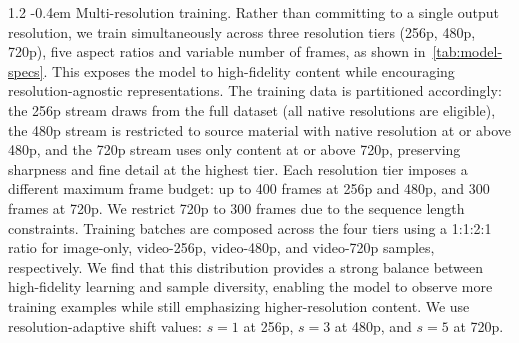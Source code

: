 \documentclass{llmxive}
\makeatletter
\providecommand{\paragraph}{  \@startsection{paragraph}{4}{\z@}    {1\baselineskip \@plus .2\baselineskip}    {-0.4em}    {\normalfont\normalsize\bfseries}}
\makeatother
\begin{document}
\paragraph{Multi-resolution training.}
Rather than committing to a single output resolution, we train simultaneously across three resolution tiers (256p, 480p, 720p), five aspect ratios and variable number of frames, as shown in~\cref{tab:model-specs}. This exposes the model to high-fidelity content while encouraging resolution-agnostic representations. The training data is partitioned accordingly: the 256p stream draws from the full dataset (all native resolutions are eligible), the 480p stream is restricted to source material with native resolution at or above 480p, and the 720p stream uses only content at or above 720p, preserving sharpness and fine detail at the highest tier. Each resolution tier imposes a different maximum frame budget: up to 400 frames at 256p and 480p, and 300 frames at 720p. We restrict 720p to 300 frames due to the sequence length constraints. Training batches are composed across the four tiers using a 1:1:2:1 ratio for image-only, video-256p, video-480p, and video-720p samples, respectively. We find that this distribution provides a strong balance between high-fidelity learning and sample diversity, enabling the model to observe more training examples while still emphasizing higher-resolution content.
We use resolution-adaptive shift values: $s=1$ at 256p, $s=3$ at 480p, and $s=5$ at 720p.
\begin{table}[t]
\centering
\small
\setlength{\tabcolsep}{6pt}
\label{tab:model-specs}
\caption{\textbf{Image/Video Model Specifications.} Supported configurations for image and video modalities. Each row shows the FPS range, frame counts (video only), and image/video dimensions (w, h) for the five supported aspect ratios at each resolution.}
\end{table}
\end{document}
